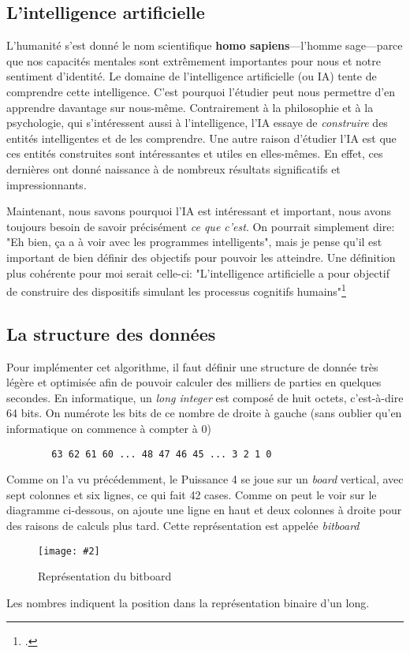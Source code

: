 \documentclass[a4paper]{article}
\newcommand{\img}[3][]{
    \begin{figure}[H]
        \centering
        \texttt{[image: \#2]}
        \caption{#1}    
    \end{figure}
}
\begin{document}
\subsection{L'intelligence artificielle}
    L'humanité s'est donné le nom scientifique \textbf{homo sapiens}---l'homme sage---parce que nos capacités mentales sont extrêmement importantes pour nous et notre sentiment d'identité. Le domaine de l'intelligence artificielle (ou IA) tente de comprendre cette intelligence. C'est pourquoi l'étudier peut nous permettre d'en apprendre davantage sur nous-même. Contrairement à la philosophie et à la psychologie, qui s'intéressent aussi à l'intelligence, l'IA essaye de \textit{construire} des entités intelligentes et de les comprendre. Une autre raison d'étudier l'IA est que ces entités construites sont intéressantes et utiles en elles-mêmes. En effet, ces dernières ont donné naissance à de nombreux résultats significatifs et impressionnants.

    Maintenant, nous savons pourquoi l'IA est intéressant et important, nous avons toujours besoin de savoir précisément \textit{ce que c'est}. On pourrait simplement dire: "Eh bien, ça a à voir avec les programmes intelligents", mais je pense qu'il est important de bien définir des objectifs pour pouvoir les atteindre. Une définition plus cohérente pour moi serait celle-ci: "L’intelligence artificielle a pour objectif de construire des dispositifs simulant les processus cognitifs humains"\footcite{haiech_2020}    


\subsection{La structure des données}
    Pour implémenter cet algorithme, il faut définir une structure de donnée très légère et optimisée afin de pouvoir calculer des milliers de parties en quelques secondes. En informatique, un \textit{long integer} est composé de huit octets, c'est-à-dire 64 bits. On numérote les bits de ce nombre de droite à gauche (sans oublier qu'en informatique on commence à compter à 0)

    \begin{lstlisting}
        63 62 61 60 ... 48 47 46 45 ... 3 2 1 0
    \end{lstlisting}
    
    Comme on l'a vu précédemment, le Puissance 4 se joue sur un \textit{board} vertical, avec sept colonnes et six lignes, ce qui fait 42 cases. Comme on peut le voir sur le diagramme ci-dessous, on ajoute une ligne en haut et deux colonnes à droite pour des raisons de calculs plus tard. Cette représentation est appelée \textit{bitboard}
    \img[Représentation du bitboard]{Images/BitBoard.png}{0.7}
    Les nombres indiquent la position dans la représentation binaire d'un long.
\end{document}
